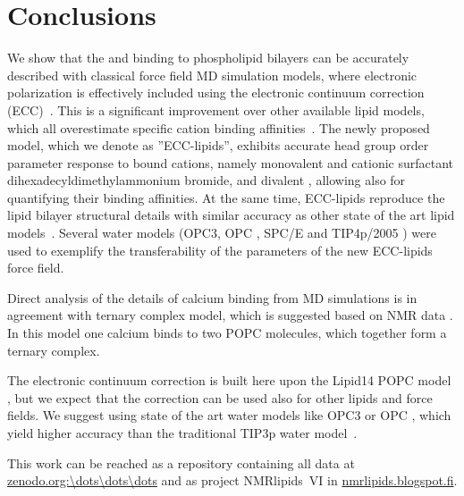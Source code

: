 \documentclass[aip,jcp,twocolumn]{revtex4}
\begin{document}
\section{Conclusions}
We show that the  and  binding to phospholipid bilayers can
be accurately described with classical force field MD simulation models, where electronic
polarization is effectively included using the electronic continuum correction (ECC)~\cite{leontyev11}.
This is a significant improvement over other available lipid models,
which all overestimate specific cation binding affinities~\cite{catte16}.  
The newly proposed model, which we denote as ''ECC-lipids'', 
exhibits accurate head group order parameter response to
bound cations, namely monovalent  and cationic surfactant dihexadecyldimethylammonium bromide, 
and divalent ,
allowing also for quantifying their binding affinities.
At the same time, ECC-lipids reproduce the lipid bilayer structural details
with similar accuracy as other state of the art lipid models~\cite{catte16}.
Several water models 
(OPC3\cite{Izadi16}, OPC \cite{Izadi14}, SPC/E \cite{Berendsen1987} and TIP4p/2005 \cite{Abascal2005}) 
were used to exemplify the transferability of 
the parameters of the new ECC-lipids force field. 

Direct analysis of the details of calcium binding from MD simulations is in agreement
with ternary complex model, which is suggested based on NMR data \cite{altenbach84}.
In this model one calcium binds to two POPC molecules, which together form a ternary
complex.

The electronic continuum correction is built here upon the Lipid14 POPC model \cite{dickson14},
but we expect that the correction can be used also for other lipids
and force fields.
We suggest using state of the art water models like OPC3\cite{Izadi16} or OPC \cite{Izadi14},
which yield higher accuracy than the traditional TIP3p water model~\cite{jorgensen83}.


This work can be reached as a repository containing all data at \url{zenodo.org:\dots\dots\dots} and as project \mbox{NMRlipids~VI} in \url{nmrlipids.blogspot.fi}.
\end{document}
